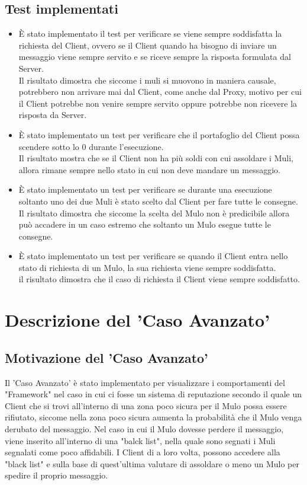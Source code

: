 \documentclass[13pt,a4paper]{article}
\begin{document}
\subsection{Test implementati}
\begin{itemize}
	\item È stato implementato il test per verificare se viene sempre soddisfatta la richiesta del Client, ovvero se il Client quando ha bisogno di inviare un messaggio viene sempre servito e se riceve sempre la risposta formulata dal Server.\\
	Il risultato dimostra che siccome i muli si muovono in maniera causale, potrebbero non arrivare mai dal Client, come anche dal Proxy, motivo per cui il Client potrebbe non venire sempre servito oppure potrebbe non ricevere la risposta da Server.
	\item È stato implementato un test per verificare che il portafoglio del Client possa scendere sotto lo 0 durante l'esecuzione.\\
	Il risultato mostra che se il Client non ha più soldi con cui assoldare i Muli, allora rimane sempre nello stato in cui non deve mandare un messaggio.
	\item È stato implementato un test per verificare se durante una esecuzione soltanto uno dei due Muli è stato scelto dal Client per fare tutte le consegne.\\
	Il risultato dimostra che siccome la scelta del Mulo non è predicibile allora può accadere in un caso estremo che soltanto un Mulo esegue tutte le consegne.
	\item È stato implementato un test per verificare se quando il Client entra nello stato di richiesta di un Mulo, la sua richiesta viene sempre soddisfatta.\\
	il risultato dimostra che il caso di richiesta il Client viene sempre soddisfatto.
	
\end{itemize}

\section{Descrizione del 'Caso Avanzato'}
\subsection{Motivazione del 'Caso  Avanzato'} 
Il 'Caso Avanzato' è stato implementato per visualizzare i comportamenti del "Framework" nel caso in cui ci fosse un sistema di reputazione secondo il quale un Client che si trovi all'interno di una zona poco sicura per il Mulo possa essere rifiutato, siccome nella zona poco sicura aumenta la probabilità che il Mulo venga derubato del messaggio. Nel caso in cui il Mulo dovesse perdere il messaggio, viene inserito all'interno di una "balck list", nella quale sono segnati i Muli segnalati come poco affidabili. I Client di a loro volta,  possono accedere alla "black list" e sulla base di quest'ultima valutare di assoldare o meno un Mulo per spedire il proprio messaggio.
\end{document}
